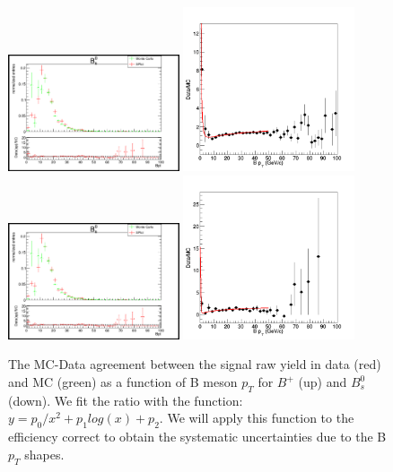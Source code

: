 \begin{figure}[h]
\begin{center}
\includegraphics[width= 0.45\textwidth]{Plots/MCReweight/Bpt/BPPtDataMC.png}
\includegraphics[width= 0.45\textwidth]{Plots/MCReweight/Bpt/BPPtWeight.png}
\includegraphics[width= 0.45\textwidth]{Plots/MCReweight/Bpt/BPPtDataMC.png}
\includegraphics[width= 0.45\textwidth]{Plots/MCReweight/Bpt/BsPtWeight.png}
\caption{The MC-Data agreement between the signal raw yield in data (red) and MC (green) as a function of B meson $p_{T}$ for $B^{+}$ (up) and $B^0_s$ (down). We fit the ratio with the function: $y = p_0/x^2 + p_1 log(x) + p_2$. We will apply this function to the efficiency correct to obtain the systematic uncertainties due to the B $p_T$ shapes.}
\label{fig:BptReweightShape}
\end{center}
\end{figure}


